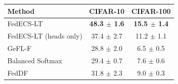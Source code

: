 \begin{tabular}{lcc}
\toprule
Method & CIFAR-10 & CIFAR-100\\
\midrule
FedECS-LT & \textbf{48.3 $\pm$ 1.6} & \textbf{15.5 $\pm$ 1.4}\\
FedECS-LT (heads only) & 37.4 $\pm$ 2.7 & 11.2 $\pm$ 1.1\\
GeFL-F & 28.8 $\pm$ 2.0 & 6.5 $\pm$ 0.5\\
Balanced Softmax & 29.4 $\pm$ 0.7 & 7.6 $\pm$ 0.6\\
FedDF & 31.8 $\pm$ 2.3 & 9.0 $\pm$ 0.3\\
\bottomrule
\end{tabular}
